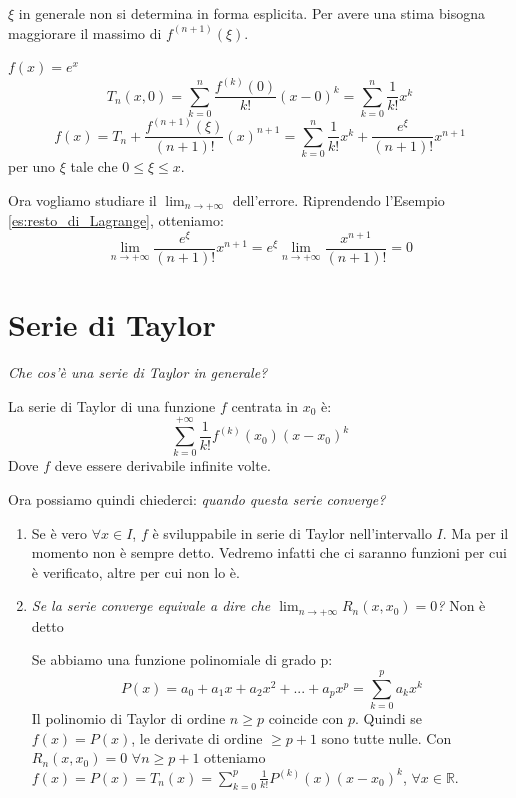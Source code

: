 $\xi$ in generale non si determina in forma esplicita. Per avere una stima bisogna maggiorare il massimo di $f^{(n+1)}(\xi)$.

\begin{example}\label{es:resto_di_Lagrange}
    $f(x)=e^x$
    \begin{equation*}
        T_n(x,0)=\sum^n_{k=0}\frac{f^{(k)}(0)}{k!}(x-0)^k=\sum^n_{k=0}\frac{1}{k!}x^k
    \end{equation*}
    \begin{equation*}
        f(x)=T_n+\frac{f^{(n+1)}(\xi)}{(n+1)!}(x)^{n+1}=\sum^n_{k=0}\frac{1}{k!}x^k+\frac{e^\xi}{(n+1)!}x^{n+1}
    \end{equation*}
    per uno $\xi$ tale che $0\leq\xi\leq x$.
\end{example}

Ora vogliamo studiare il $\lim_{n\to+\infty}$ dell'errore. Riprendendo l'Esempio \ref{es:resto_di_Lagrange}, otteniamo:
\begin{equation*}
    \lim_{n\to+\infty}\frac{e^\xi}{(n+1)!}x^{n+1}=e^\xi\lim_{n\to+\infty}\frac{x^{n+1}}{(n+1)!}=0
\end{equation*}

\section{Serie di Taylor}
\textit{Che cos'è una serie di Taylor in generale?}
    
\begin{definition*}
    La serie di Taylor di una funzione $f$ centrata in $x_0$ è:
\begin{equation*}
    \sum^{+\infty}_{k=0}\frac{1}{k!}f^{(k)}(x_0)(x-x_0)^k
\end{equation*}
Dove $f$ deve essere derivabile infinite volte.
\end{definition*}

Ora possiamo quindi chiederci: \textit{quando questa serie converge?} 
\begin{enumerate}
    \item Se è vero $\forall x\in I$, $f$ è sviluppabile in serie di Taylor nell'intervallo $I$. Ma per il momento non è sempre detto. Vedremo infatti che ci saranno funzioni per cui è verificato, altre per cui non lo è.
    \item \textit{Se la serie converge equivale a dire che $\lim_{n\to+\infty}R_n(x,x_0)=0$?} Non è detto
    \begin{osservation*}
        Se abbiamo una funzione polinomiale di grado p:
        \begin{equation*}
            P(x)=a_0+a_1x+a_2x^2+...+a_px^p=\sum^p_{k=0}a_kx^k
        \end{equation*}
        Il polinomio di Taylor di ordine $n\geq p$ coincide con $p$. Quindi se $f(x)=P(x)$, le derivate di ordine $\geq p+1$ sono tutte nulle.
        Con $R_n(x,x_0)=0$ $\forall n\geq p+1$ otteniamo $f(x)=P(x)=T_n(x)=\sum^p_{k=0}\frac{1}{k!}P^{(k)}(x)(x-x_0)^k$, $\forall x\in\mathbb{R}$.
    \end{osservation*}
\end{enumerate}


